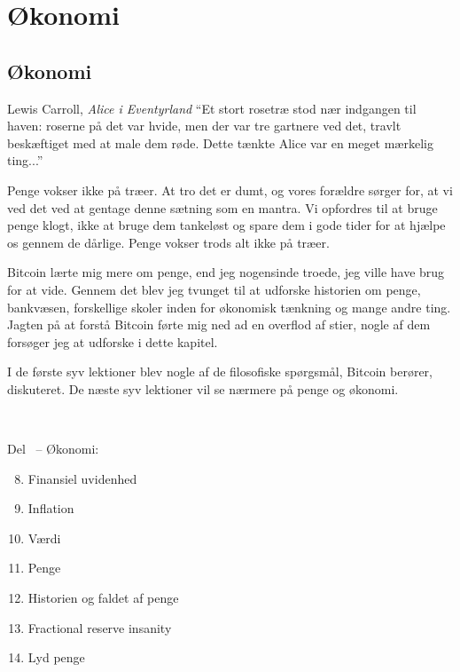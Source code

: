 \part{Økonomi}
\label{ch:økonomi}
\chapter*{Økonomi}

\begin{chapquote}{Lewis Carroll, \textit{Alice i Eventyrland}}
\enquote{Et stort rosetræ stod nær indgangen til haven: roserne på det var 
hvide, men der var tre gartnere ved det, travlt beskæftiget med at male dem 
røde. Dette tænkte Alice var en meget mærkelig ting...}
\end{chapquote}

Penge vokser ikke på træer. At tro det er dumt, og vores forældre sørger for, 
at vi ved det ved at gentage denne sætning som en mantra. Vi opfordres til at 
bruge penge klogt, ikke at bruge dem tankeløst og spare dem i gode tider for at 
hjælpe os gennem de dårlige. Penge vokser trods alt ikke på træer.

Bitcoin lærte mig mere om penge, end jeg nogensinde troede, jeg ville have brug 
for at vide. Gennem det blev jeg tvunget til at udforske historien om penge, 
bankvæsen, forskellige skoler inden for økonomisk tænkning og mange andre ting. 
Jagten på at forstå Bitcoin førte mig ned ad en overflod af stier, nogle af dem 
forsøger jeg at udforske i dette kapitel.

I de første syv lektioner blev nogle af de filosofiske spørgsmål, Bitcoin 
berører, diskuteret. De næste syv lektioner vil se nærmere på penge og økonomi.

~

\begin{samepage}
Del~\ref{ch:økonomi} -- Økonomi:

\begin{enumerate}
  \setcounter{enumi}{7}
  \item Finansiel uvidenhed
  \item Inflation
  \item Værdi
  \item Penge
  \item Historien og faldet af penge
  \item Fractional reserve insanity
  \item Lyd penge
\end{enumerate}
\end{samepage}

